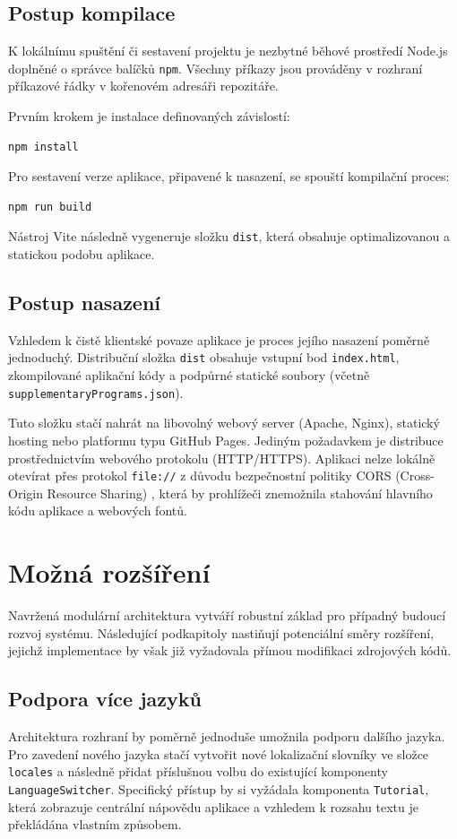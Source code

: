 \subsection{Postup kompilace}
\label{sec:kompilace}
K lokálnímu spuštění či sestavení projektu je nezbytné běhové prostředí Node.js doplněné o správce balíčků \texttt{npm}. 
Všechny příkazy jsou prováděny v rozhraní příkazové řádky v kořenovém adresáři repozitáře.

Prvním krokem je instalace definovaných závislostí:
\begin{verbatim}
npm install
\end{verbatim}

Pro sestavení verze aplikace, připavené k nasazení, se spouští kompilační proces:
\begin{verbatim}
npm run build
\end{verbatim}

Nástroj Vite následně vygeneruje složku \texttt{dist}, která obsahuje optimalizovanou a statickou podobu aplikace.

\subsection{Postup nasazení}
\label{sec:nasazení}
Vzhledem k čistě klientské povaze aplikace je proces jejího nasazení poměrně jednoduchý.
Distribuční složka \texttt{dist} obsahuje vstupní bod \texttt{index.html}, zkompilované aplikační kódy a podpůrné statické soubory (včetně \texttt{supplementaryPrograms.json}). 

Tuto složku stačí nahrát na libovolný webový server (Apache, Nginx), statický hosting nebo platformu typu GitHub Pages. 
Jediným požadavkem je distribuce prostřednictvím webového protokolu (HTTP/HTTPS). 
Aplikaci nelze lokálně otevírat přes protokol \texttt{file://} z důvodu bezpečnostní politiky CORS (Cross-Origin Resource Sharing) \cite{mdnwebdocs_2025_crossorigin}, která by prohlížeči znemožnila stahování hlavního kódu aplikace a webových fontů.


\section{Možná rozšíření}
\label{sec:rozsireni}
Navržená modulární architektura vytváří robustní základ pro případný budoucí rozvoj systému. 
Následující podkapitoly nastiňují potenciální směry rozšíření, jejichž implementace by však již vyžadovala přímou modifikaci zdrojových kódů.

\subsection{Podpora více jazyků}
Architektura rozhraní by poměrně jednoduše umožnila podporu dalšího jazyka.
Pro zavedení nového jazyka stačí vytvořit nové lokalizační slovníky ve složce \texttt{locales} a následně přidat příslušnou volbu do existující komponenty \texttt{LanguageSwitcher}.
Specifický přístup by si vyžádala komponenta \texttt{Tutorial}, která zobrazuje centrální nápovědu aplikace a vzhledem k rozsahu textu je překládána vlastním způsobem.

